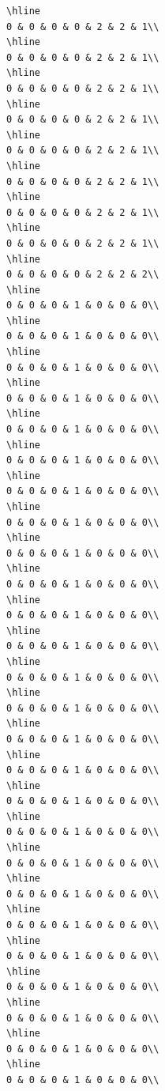 \documentclass[
]{article}
\begin{document}
\begin{verbatim}
\hline
0 & 0 & 0 & 0 & 2 & 2 & 1\\
\hline
0 & 0 & 0 & 0 & 2 & 2 & 1\\
\hline
0 & 0 & 0 & 0 & 2 & 2 & 1\\
\hline
0 & 0 & 0 & 0 & 2 & 2 & 1\\
\hline
0 & 0 & 0 & 0 & 2 & 2 & 1\\
\hline
0 & 0 & 0 & 0 & 2 & 2 & 1\\
\hline
0 & 0 & 0 & 0 & 2 & 2 & 1\\
\hline
0 & 0 & 0 & 0 & 2 & 2 & 1\\
\hline
0 & 0 & 0 & 0 & 2 & 2 & 2\\
\hline
0 & 0 & 0 & 1 & 0 & 0 & 0\\
\hline
0 & 0 & 0 & 1 & 0 & 0 & 0\\
\hline
0 & 0 & 0 & 1 & 0 & 0 & 0\\
\hline
0 & 0 & 0 & 1 & 0 & 0 & 0\\
\hline
0 & 0 & 0 & 1 & 0 & 0 & 0\\
\hline
0 & 0 & 0 & 1 & 0 & 0 & 0\\
\hline
0 & 0 & 0 & 1 & 0 & 0 & 0\\
\hline
0 & 0 & 0 & 1 & 0 & 0 & 0\\
\hline
0 & 0 & 0 & 1 & 0 & 0 & 0\\
\hline
0 & 0 & 0 & 1 & 0 & 0 & 0\\
\hline
0 & 0 & 0 & 1 & 0 & 0 & 0\\
\hline
0 & 0 & 0 & 1 & 0 & 0 & 0\\
\hline
0 & 0 & 0 & 1 & 0 & 0 & 0\\
\hline
0 & 0 & 0 & 1 & 0 & 0 & 0\\
\hline
0 & 0 & 0 & 1 & 0 & 0 & 0\\
\hline
0 & 0 & 0 & 1 & 0 & 0 & 0\\
\hline
0 & 0 & 0 & 1 & 0 & 0 & 0\\
\hline
0 & 0 & 0 & 1 & 0 & 0 & 0\\
\hline
0 & 0 & 0 & 1 & 0 & 0 & 0\\
\hline
0 & 0 & 0 & 1 & 0 & 0 & 0\\
\hline
0 & 0 & 0 & 1 & 0 & 0 & 0\\
\hline
0 & 0 & 0 & 1 & 0 & 0 & 0\\
\hline
0 & 0 & 0 & 1 & 0 & 0 & 0\\
\hline
0 & 0 & 0 & 1 & 0 & 0 & 0\\
\hline
0 & 0 & 0 & 1 & 0 & 0 & 0\\
\hline
0 & 0 & 0 & 1 & 0 & 0 & 0\\

\end{verbatim}
\end{document}
